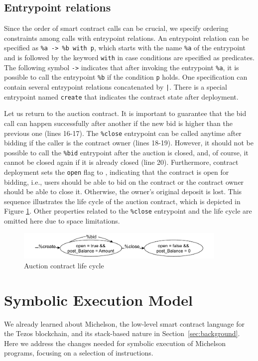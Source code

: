 \documentclass[runningheads]{llncs}
\begin{document}
\subsection{Entrypoint relations}
\label{sec:entrypoint-relations}
Since the order of smart contract
calls can be crucial, we specify ordering constraints among calls with
 entrypoint relations. An entrypoint relation can be specified as
\lstinline/%a -> %b with p/, which starts with the name
\lstinline/%a/ of the entrypoint and is followed by the keyword
\lstinline/with/ in case conditions are specified as predicates. The
following symbol \lstinline/->/ indicates that after invoking the entrypoint \lstinline/%a/, it is possible  to call
the entrypoint \lstinline/%b/ if the condition \lstinline/p/ holds. One specification can contain several entrypoint relations concatenated by
\lstinline/|/. There is a special entrypoint named \lstinline/create/
that indicates the contract state after deployment. 

Let us return to the auction contract. It is important to guarantee
that  the bid call can happen successfully after another if the new bid is higher than the previous
one (lines 16-17). The  \lstinline/%close/ entrypoint can be called
anytime after bidding if the caller is the contract owner (lines 18-19). However, it
should not be possible to call the  \lstinline/%bid/ entrypoint after
the auction is closed, and, of course, it cannot be closed
again if it is already closed (line 20).  Furthermore, contract deployment sets the  \lstinline/open/ flag to
\TRUE, indicating that the contract is open for bidding, i.e., users
should be able to bid on the contract or the contract owner should be
able to close it. Otherwise, the owner's original
deposit is lost. This sequence  illustrates
the life cycle of the auction contract, which is depicted in Figure
\ref{fig:auction-life-cycle}. Other properties related to the \lstinline|%close| entrypoint and the life cycle are omitted here due to space limitations.
\begin{figure}[tp]
    \centering
    \includegraphics[width=0.9\textwidth]{auction}
    \caption{Auction contract life cycle}
    \label{fig:auction-life-cycle}
\end{figure}

\section{Symbolic Execution Model}
\label{sec:symbolic-execution-model} 
We already learned about Michelson, the low-level smart contract
language for the Tezos blockchain, and its stack-based nature in
Section~\ref{sec:background}.  Here we address the changes needed for symbolic execution of Michelson programs, focusing on a selection of instructions. 
\end{document}
